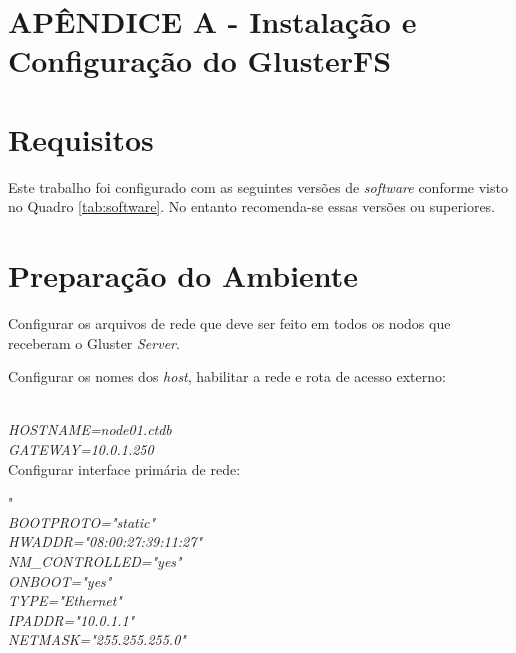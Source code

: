 
\onehalfspacing 


\appendix
\setcounter{page}{87}

\section*{APÊNDICE A - Instalação e Configuração do GlusterFS}

\section*{Requisitos}

Este trabalho foi configurado com as seguintes versões de \textit{software} conforme visto no Quadro \ref{tab:software}.
No entanto recomenda-se essas versões ou superiores.

\section*{Preparação do Ambiente}

Configurar os arquivos de rede que deve ser feito em todos os nodos que receberam o Gluster \textit{Server}.

Configurar os nomes dos \textit{host}, habilitar a rede e rota de acesso externo:


   \\
 \textit{HOSTNAME=node01.ctdb}  \\
 \textit{GATEWAY=10.0.1.250 } \\
 
 Configurar interface primária de rede:
 
 
" \\
\textit{BOOTPROTO="static"} \\
\textit{HWADDR="08:00:27:39:11:27"} \\
\textit{NM\_CONTROLLED="yes"} \\
\textit{ONBOOT="yes"} \\
\textit{TYPE="Ethernet"} \\
\textit{IPADDR="10.0.1.1"} \\
\textit{NETMASK="255.255.255.0"} \\

